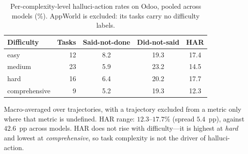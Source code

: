 \begin{table}[H]
\centering
\caption{Per-complexity-level halluci-action rates on Odoo, pooled across models (\%).
AppWorld is excluded: its tasks carry no difficulty labels.}
\label{tab:har-by-complexity}
\begin{tabular}{l r c c c}
\toprule
\textbf{Difficulty} & \textbf{Tasks} & \textbf{Said-not-done} & \textbf{Did-not-said} & \textbf{HAR} \\
\midrule
easy           & 12 & 8.2 & 19.3 & 17.4 \\
medium         & 23 & 5.9 & 23.2 & 14.5 \\
hard           & 16 & 6.4 & 20.2 & 17.7 \\
comprehensive  &  9 & 5.2 & 19.3 & 12.3 \\
\bottomrule
\end{tabular}

\vspace{3pt}
\raggedright
\footnotesize Macro-averaged over trajectories, with a trajectory excluded from a
metric only where that metric is undefined. HAR range: $12.3$--$17.7\%$
(spread $5.4$~pp), against $42.6$~pp
across models. HAR does not rise with difficulty---it is highest at \emph{hard} and
lowest at \emph{comprehensive}, so task complexity is not the driver of halluci-action.
\end{table}
